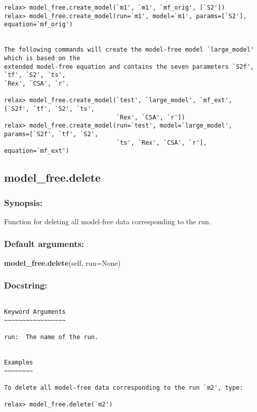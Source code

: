 {\begin{verbatim}
relax> model_free.create_model(`m1', `m1', `mf_orig', [`S2'])
relax> model_free.create_model(run=`m1', model=`m1', params=[`S2'], equation=`mf_orig')


The following commands will create the model-free model `large_model' which is based on the
extended model-free equation and contains the seven parameters `S2f', `tf', `S2', `ts',
`Rex', `CSA', `r'.

relax> model_free.create_model(`test', `large_model', `mf_ext', [`S2f', `tf', `S2', `ts',
                               `Rex', `CSA', `r'])
relax> model_free.create_model(run=`test', model=`large_model', params=[`S2f', `tf', `S2',
                               `ts', `Rex', `CSA', `r'], equation=`mf_ext')
\end{verbatim}
}



\newpage

\subsection{model\_free.delete}


\subsubsection{Synopsis:}

Function for deleting all model-free data corresponding to the run.

\subsubsection{Default arguments:}

\textsf{\textbf{model\_free.delete}(self, run=None)
}


\subsubsection{Docstring:}

{\scriptsize
\begin{verbatim}

Keyword Arguments
~~~~~~~~~~~~~~~~~

run:  The name of the run.


Examples
~~~~~~~~

To delete all model-free data corresponding to the run `m2', type:

relax> model_free.delete(`m2')
\end{verbatim}
}



